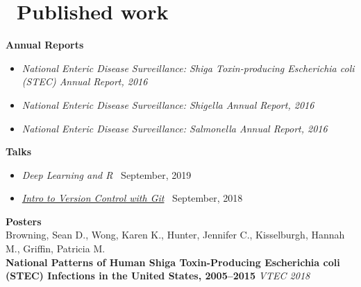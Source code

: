 \documentclass{resume}
\begin{document}
\section{\faFileTextO\ Published work}

\textbf{Annual Reports}

\begin{itemize}
  \item \textit{National Enteric Disease Surveillance: Shiga Toxin-producing Escherichia coli (STEC) Annual Report, 2016}
  \item \textit{National Enteric Disease Surveillance: Shigella Annual Report, 2016}
  \item \textit{National Enteric Disease Surveillance: Salmonella Annual Report, 2016} \\
\end{itemize}

\textbf{Talks}

\begin{itemize}
  \item \textit{Deep Learning and R} \, September, 2019 \\
  \item \href{https://beansrowning.github.io/git-talk}{\textit{Intro to Version Control with Git}} \, September, 2018
\end{itemize}

\textbf{Posters} \\

Browning, Sean D., Wong, Karen K., Hunter, Jennifer C., Kisselburgh, Hannah M., Griffin, Patricia M. \\ 
\textbf{National Patterns of Human Shiga Toxin-Producing Escherichia coli (STEC) Infections in the United States, 2005–2015} \textit{VTEC 2018} \\



%
%
\end{document}

